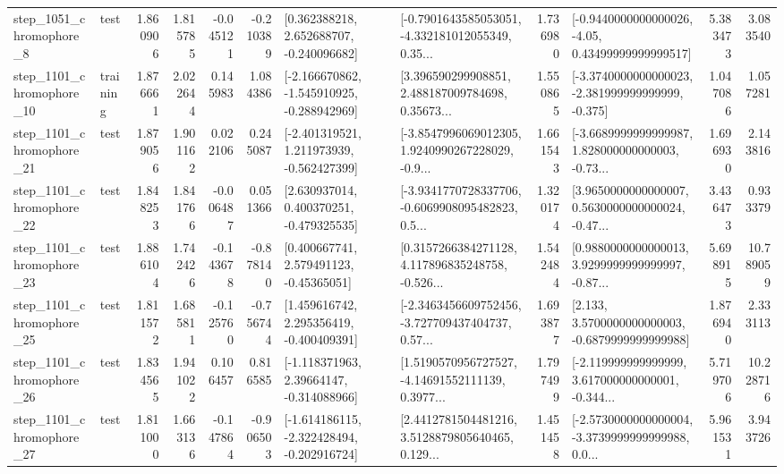 \begin{tabular}{llrrrrllrlrr}
  step\_1051\_chromophore\_8 &      test &      1.860906 &    1.815785 &     -0.045121 & -0.210389 &    [0.362388218, 2.652688707, -0.240096682] &  [-0.7901643585053051, -4.332181012055349, 0.35... &       1.736980 &  [-0.9440000000000026, -4.05, 0.43499999999999517] &            5.383473 &          3.083540 \\
 step\_1101\_chromophore\_10 &  training &      1.876661 &    2.022644 &      0.145983 &  1.084386 &  [-2.166670862, -1.545910925, -0.288942969] &  [3.396590299908851, 2.488187009784698, 0.35673... &       1.550865 &  [-3.3740000000000023, -2.381999999999999, -0.375] &            1.047086 &          1.057281 \\
 step\_1101\_chromophore\_21 &      test &      1.879056 &    1.901162 &      0.022106 &  0.245087 &   [-2.401319521, 1.211973939, -0.562427399] &  [-3.8547996069012305, 1.9240990267228029, -0.9... &       1.661543 &  [-3.6689999999999987, 1.828000000000003, -0.73... &            1.696930 &          2.143816 \\
 step\_1101\_chromophore\_22 &      test &      1.848253 &    1.841766 &     -0.006487 &  0.051366 &    [2.630937014, 0.400370251, -0.479325535] &  [-3.9341770728337706, -0.6069908095482823, 0.5... &       1.320174 &  [3.9650000000000007, 0.5630000000000024, -0.47... &            3.436473 &          0.933379 \\
 step\_1101\_chromophore\_23 &      test &      1.886104 &    1.742426 &     -0.143678 & -0.878140 &     [0.400667741, 2.579491123, -0.45365051] &  [0.3157266384271128, 4.117896835248758, -0.526... &       1.542484 &  [0.9880000000000013, 3.9299999999999997, -0.87... &            5.698915 &         10.789059 \\
 step\_1101\_chromophore\_25 &      test &      1.811572 &    1.685811 &     -0.125760 & -0.756744 &    [1.459616742, 2.295356419, -0.400409391] &  [-2.3463456609752456, -3.727709437404737, 0.57... &       1.693877 &   [2.133, 3.5700000000000003, -0.6879999999999988] &            1.876940 &          2.333113 \\
 step\_1101\_chromophore\_26 &      test &      1.834565 &    1.941022 &      0.106457 &  0.816585 &    [-1.118371963, 2.39664147, -0.314088966] &  [1.5190570956727527, -4.14691552111139, 0.3977... &       1.797499 &  [-2.119999999999999, 3.617000000000001, -0.344... &            5.719706 &         10.228716 \\
 step\_1101\_chromophore\_27 &      test &      1.811000 &    1.663136 &     -0.147864 & -0.906503 &  [-1.614186115, -2.322428494, -0.202916724] &  [2.4412781504481216, 3.5128879805640465, 0.129... &       1.451458 &  [-2.5730000000000004, -3.3739999999999988, 0.0... &            5.961531 &          3.943726 \\

\end{tabular}
